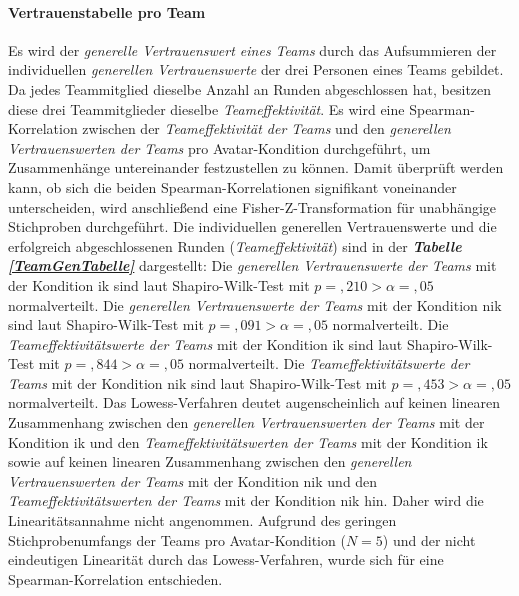 \documentclass[a4paper,11pt]{article}%
\renewcommand{\\}{\vspace*{0.5\baselineskip} \newline}
\begin{document}
{\paragraph{Vertrauenstabelle pro Team}
Es wird der \textit{generelle Vertrauenswert eines Teams} durch das Aufsummieren der individuellen \textit{generellen Vertrauenswerte} der drei Personen eines Teams gebildet.
Da jedes Teammitglied dieselbe Anzahl an Runden abgeschlossen hat, besitzen diese drei Teammitglieder dieselbe \textit{Teameffektivität}.
Es wird eine Spearman-Korrelation zwischen der \textit{Teameffektivität der Teams} und den \textit{generellen Vertrauenswerten der Teams} pro Avatar-Kondition durchgeführt, um Zusammenhänge untereinander festzustellen zu können.
Damit überprüft werden kann, ob sich die beiden Spearman-Korrelationen signifikant voneinander unterscheiden, wird anschließend eine Fisher-Z-Transformation für unabhängige Stichproben durchgeführt. Die individuellen generellen Vertrauenswerte und die erfolgreich abgeschlossenen Runden (\textit{Teameffektivität}) sind in der \textbf{\textit{Tabelle \ref{TeamGenTabelle}}} dargestellt:\\
Die \textit{generellen Vertrauenswerte der Teams} mit der Kondition \ac{ik} sind laut Shapiro-Wilk-Test mit $p =,210 > \alpha = ,05$ normalverteilt. \newline
Die \textit{generellen Vertrauenswerte der Teams} mit der Kondition \ac{nik} sind laut Shapiro-Wilk-Test mit $p =,091 > \alpha = ,05$ normalverteilt. \newline
Die \textit{Teameffektivitätswerte der Teams} mit der Kondition \ac{ik} sind laut Shapiro-Wilk-Test mit $p =,844 > \alpha = ,05$ normalverteilt. \newline
Die \textit{Teameffektivitätswerte der Teams} mit der Kondition \ac{nik} sind laut Shapiro-Wilk-Test mit $p =,453 > \alpha = ,05$ normalverteilt. \\
Das Lowess-Verfahren deutet augenscheinlich auf keinen linearen Zusammenhang zwischen den \textit{generellen Vertrauenswerten der Teams} mit der Kondition \ac{ik} und den \textit{Teameffektivitätswerten der Teams} mit der Kondition \ac{ik} sowie auf keinen linearen Zusammenhang zwischen den \textit{generellen Vertrauenswerten der Teams} mit der Kondition \ac{nik} und den \textit{Teameffektivitätswerten der Teams} mit der Kondition \ac{nik} hin. Daher wird die Linearitätsannahme nicht angenommen.\\
Aufgrund des geringen Stichprobenumfangs der Teams pro Avatar-Kondition ($N=5$) und der nicht eindeutigen Linearität durch das Lowess-Verfahren, wurde sich für eine Spearman-Korrelation entschieden.

}
\end{document}
